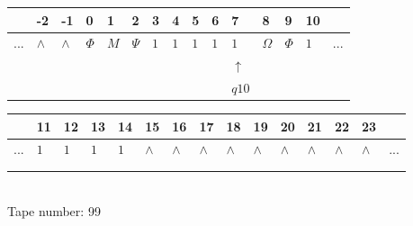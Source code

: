 \documentclass[11pt]{article}
\begin{document}
\begin{table}[H]
\centering
\begin{tabular}{lllllllllllllll}
 & -2 & -1 & 0 & 1 & 2 & 3 & 4 & 5 & 6 & 7 & 8 & 9 & 10 & \\
\hline
$...$ & \multicolumn{1}{|l|}{$\wedge$} & \multicolumn{1}{|l|}{$\wedge$} & \multicolumn{1}{|l|}{$\Phi$} & \multicolumn{1}{|l|}{$M$} & \multicolumn{1}{|l|}{$\Psi$} & \multicolumn{1}{|l|}{$1$} & \multicolumn{1}{|l|}{$1$} & \multicolumn{1}{|l|}{$1$} & \multicolumn{1}{|l|}{$1$} & \multicolumn{1}{|l|}{$1$} & \multicolumn{1}{|l|}{$\Omega$} & \multicolumn{1}{|l|}{$\Phi$} & \multicolumn{1}{|l|}{$1$} & $...$\\
\hline
&  &  &  &  &  &  &  &  &  & $\uparrow$ &  &  &  &  \\
&  &  &  &  &  &  &  &  &  & $ q10 $ &  &  &  &  \\
\end{tabular}
\begin{tabular}{lllllllllllllll}
 & 11 & 12 & 13 & 14 & 15 & 16 & 17 & 18 & 19 & 20 & 21 & 22 & 23 & \\
\hline
$...$ & \multicolumn{1}{|l|}{$1$} & \multicolumn{1}{|l|}{$1$} & \multicolumn{1}{|l|}{$1$} & \multicolumn{1}{|l|}{$1$} & \multicolumn{1}{|l|}{$\wedge$} & \multicolumn{1}{|l|}{$\wedge$} & \multicolumn{1}{|l|}{$\wedge$} & \multicolumn{1}{|l|}{$\wedge$} & \multicolumn{1}{|l|}{$\wedge$} & \multicolumn{1}{|l|}{$\wedge$} & \multicolumn{1}{|l|}{$\wedge$} & \multicolumn{1}{|l|}{$\wedge$} & \multicolumn{1}{|l|}{$\wedge$} & $...$\\
\hline
&  &  &  &  &  &  &  &  &  &  &  &  &  &  \\
&  &  &  &  &  &  &  &  &  &  &  &  &  &  \\
\end{tabular}
\\
Tape number: 99
\noindent\makebox[\linewidth]{\hdashrule{\textwidth}{1pt}{1pt}}\end{table}
\clearpage
\end{document}
